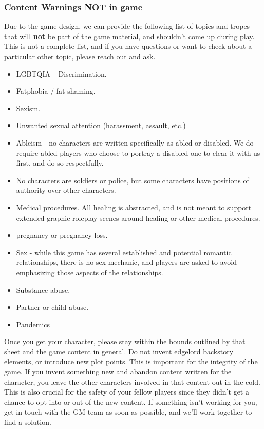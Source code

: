 \documentclass[sheet]{GL2020}
\begin{document}
\subsubsection{Content Warnings NOT in game}
Due to the game design, we can provide the following list of topics and tropes that will \textbf{not} be part of the game material, and shouldn’t come up during play. This is not a complete list, and if you have questions or want to check about a particular other topic, please reach out and ask.

\begin{multicols}{2}
\begin{itemize}
  	\item LGBTQIA+ Discrimination.
	\item Fatphobia / fat shaming.
	\item Sexism.
\item Unwanted sexual attention (harassment, assault, etc.)
	\item Ableism - no characters are written specifically as abled or disabled. We do require abled players who choose to portray a disabled one to clear it with us first, and do so respectfully.
	\item No characters are soldiers or police, but some characters have positions of authority over other characters.
	\item Medical procedures. All healing is abstracted, and is not meant to support extended graphic roleplay scenes around healing or other medical procedures.
	\item pregnancy or pregnancy loss.
	\item Sex - while this game has several established and potential romantic relationships, there is no sex mechanic, and players are asked to avoid emphasizing those aspects of the relationships.
	\item Substance abuse.
	\item Partner or child abuse.
	\item Pandemics
\end{itemize}
\end{multicols}

Once you get your character, please stay within the bounds outlined by that sheet and the game content in general. Do not invent edgelord backstory elements, or introduce new plot points. This is important for the integrity of the game. If you invent something new and abandon content written for the character, you leave the other characters involved in that content out in the cold. This is also crucial for the safety of your fellow players since they didn’t get a chance to opt into or out of the new content. If something isn’t working for you, get in touch with the GM team as soon as possible, and we’ll work together to find a solution.
\end{document}
